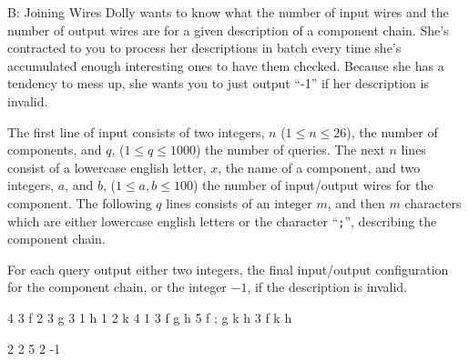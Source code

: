 \begin{problem}{B: Joining Wires}
Dolly wants to know what the number of input wires and the number of output wires are for a given description of a component chain.
She's contracted to you to process her descriptions in batch every time she's accumulated enough interesting ones to have them checked.
Because she has a tendency to mess up, she wants you to just output ``-1'' if her description is invalid.
\end{problem}

\newpage

\begin{formalin}
The first line of input consists of two integers, $n$ ($1 \leq n \leq 26$), the number of components, and $q$, ($1 \leq q \leq 1000$) the number of queries.
The next $n$ lines consist of a lowercase english letter, $x$, the name of a component, and two integers, $a$, and $b$, ($1 \leq a, b \leq 100$) the number of input/output wires for the component.
The following $q$ lines consists of an integer $m$, and then $m$ characters which are either lowercase english letters or the character ``\texttt{;}'', describing the component chain.
\end{formalin}

\begin{formalout}
For each query output either two integers, the final input/output configuration for the component chain, or the integer $-1$, if the description is invalid.
\end{formalout}

\begin{datain}
4 3
f 2 3
g 3 1
h 1 2
k 4 1
3 f g h
5 f ; g k h 
3 f k h
\end{datain}

\begin{dataout}
2 2
5 2
-1
\end{dataout}
